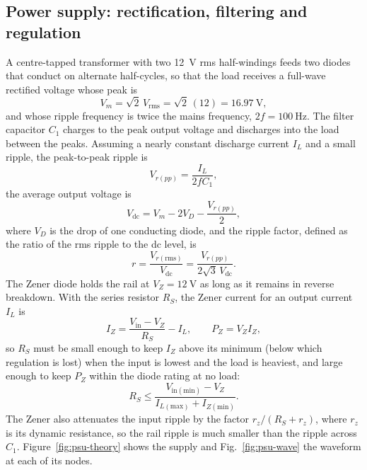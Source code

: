 \documentclass[12pt,a4paper]{article}
\begin{document}
	\subsection{Power supply: rectification, filtering and regulation}
	A centre-tapped transformer with two \SI{12}{\volt} rms half-windings feeds two diodes that conduct on alternate half-cycles, so that the load receives a full-wave rectified voltage whose peak is
	\begin{equation}
		V_m=\sqrt{2}\,V_{\mathrm{rms}}=\sqrt{2}\,(12)=\SI{16.97}{\volt},
		\label{eq:vm}
	\end{equation}
	and whose ripple frequency is twice the mains frequency, $2f=\SI{100}{\hertz}$. The filter capacitor $C_1$ charges to the peak output voltage and discharges into the load between the peaks. Assuming a nearly constant discharge current $I_L$ and a small ripple, the peak-to-peak ripple is
	\begin{equation}
		V_{r(pp)}=\frac{I_L}{2fC_1},
		\label{eq:vrpp}
	\end{equation}
	the average output voltage is
	\begin{equation}
		V_{\mathrm{dc}}=V_m-2V_D-\frac{V_{r(pp)}}{2},
		\label{eq:vdc}
	\end{equation}
	where $V_D$ is the drop of one conducting diode, and the ripple factor, defined as the ratio of the rms ripple to the dc level, is
	\begin{equation}
		r=\frac{V_{r(\mathrm{rms})}}{V_{\mathrm{dc}}}=\frac{V_{r(pp)}}{2\sqrt{3}\,V_{\mathrm{dc}}} .
		\label{eq:rfactor}
	\end{equation}
	The Zener diode holds the rail at $V_Z=\SI{12}{\volt}$ as long as it remains in reverse breakdown. With the series resistor $R_S$, the Zener current for an output current $I_L$ is
	\begin{equation}
		I_Z=\frac{V_{\mathrm{in}}-V_Z}{R_S}-I_L,
		\qquad P_Z=V_ZI_Z,
		\label{eq:iz}
	\end{equation}
	so $R_S$ must be small enough to keep $I_Z$ above its minimum (below which regulation is lost) when the input is lowest and the load is heaviest, and large enough to keep $P_Z$ within the diode rating at no load:
	\begin{equation}
		R_S\le\frac{V_{\mathrm{in(min)}}-V_Z}{I_{L(\mathrm{max})}+I_{Z(\mathrm{min})}} .
		\label{eq:rs}
	\end{equation}
	The Zener also attenuates the input ripple by the factor $r_z/(R_S+r_z)$, where $r_z$ is its dynamic resistance, so the rail ripple is much smaller than the ripple across $C_1$. Figure~\ref{fig:psu-theory} shows the supply and Fig.~\ref{fig:psu-wave} the waveform at each of its nodes.
\end{document}
